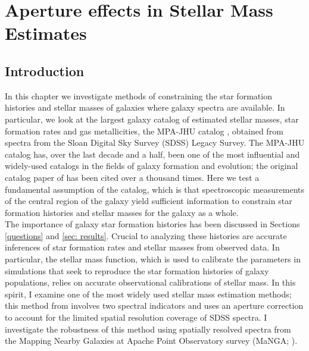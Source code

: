 \chapter{Aperture effects in Stellar Mass Estimates}

\label{ch:acm}
\newpage

\section{Introduction}

In this chapter we investigate methods of constraining the star formation histories and stellar masses of galaxies where galaxy spectra are available. In particular, we look at the largest galaxy catalog of estimated stellar masses, star formation rates and gas metallicities, the MPA-JHU catalog \citep{brinchmann_physical_2004, kauffmann_stellar_2003, tremonti_origin_2004}, obtained from spectra from the Sloan Digital Sky Survey (SDSS) Legacy Survey. The MPA-JHU catalog has, over the last decade and a half, been one of the most influential and widely-used catalogs in the fields of galaxy formation and evolution; the original catalog paper of \citet{kauffmann_stellar_2003} has been cited over a thousand times. Here we test a fundamental assumption of the catalog, which is that spectroscopic measurements of the central region of the galaxy yield sufficient information to constrain star formation histories and stellar masses for the galaxy as a whole.\\

The importance of galaxy star formation histories has been discussed in Sections \ref{questions} and  \ref{sec: results}. Crucial to analyzing these histories are accurate inferences of star formation rates and stellar masses from observed data. In particular, the stellar mass function, which is used to calibrate the parameters in simulations that seek to reproduce the star formation histories of galaxy populations, relies on accurate observational calibrations of stellar mass. In this spirit, I examine one of the most widely used stellar mass estimation methods; this method from \citet{kauffmann_stellar_2003} involves two spectral indicators and uses an aperture correction to account for the limited spatial resolution coverage of SDSS spectra. I investigate the robustness of this method using spatially resolved spectra from the Mapping Nearby Galaxies at Apache Point Observatory survey (MaNGA; \citealt{bundy_overview_2014}).\\

